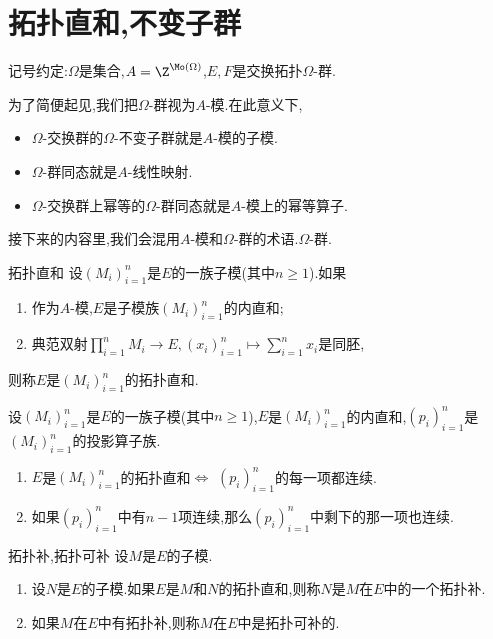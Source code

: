 \section{拓扑直和,不变子群}

记号约定:$\Omega$是集合,$A=\Z^{\Mo\left(\Omega\right)}$,$E,F$是交换拓扑$\Omega$-群.

\begin{convention}{}{}
	为了简便起见,我们把$\Omega$-群视为$A$-模.在此意义下,
	\begin{itemize}
		\item $\Omega$-交换群的$\Omega$-不变子群就是$A$-模的子模.
		\item $\Omega$-群同态就是$A$-线性映射.
		\item $\Omega$-交换群上幂等的$\Omega$-群同态就是$A$-模上的幂等算子.
	\end{itemize}
	接下来的内容里,我们会混用$A$-模和$\Omega$-群的术语.$\Omega$-群.
\end{convention}

\begin{definition}{拓扑直和}{}
	设$\left(M_{i}\right)_{i=1}^{n}$是$E$的一族子模(其中$n\geq 1$).如果
	\begin{enumerate}
		\item 作为$A$-模,$E$是子模族$\left(M_{i}\right)_{i=1}^{n}$的内直和;
		\item 典范双射$\prod\limits_{i=1}^{n}M_{i}\to E,\left(x_{i}\right)_{i=1}^{n}\mapsto\sum\limits_{i=1}^{n}x_{i}$是同胚,
	\end{enumerate}
	则称$E$是$\left(M_{i}\right)_{i=1}^{n}$的拓扑直和.
\end{definition}

\begin{proposition}{}{}
	设$\left(M_{i}\right)_{i=1}^{n}$是$E$的一族子模(其中$n\geq 1$),$E$是$\left(M_{i}\right)_{i=1}^{n}$的内直和,$\left(p_{i}\right)_{i=1}^{n}$是$\left(M_{i}\right)_{i=1}^{n}$的投影算子族.
	\begin{enumerate}
		\item $E$是$\left(M_{i}\right)_{i=1}^{n}$的拓扑直和$\iff$ $\left(p_{i}\right)_{i=1}^{n}$的每一项都连续.
		\item 如果$\left(p_{i}\right)_{i=1}^{n}$中有$n-1$项连续,那么$\left(p_{i}\right)_{i=1}^{n}$中剩下的那一项也连续.
	\end{enumerate}
\end{proposition}

\begin{definition}{拓扑补,拓扑可补}{}
	设$M$是$E$的子模.
	\begin{enumerate}
		\item 设$N$是$E$的子模.如果$E$是$M$和$N$的拓扑直和,则称$N$是$M$在$E$中的一个拓扑补.
		\item 如果$M$在$E$中有拓扑补,则称$M$在$E$中是拓扑可补的.
	\end{enumerate}
\end{definition}

